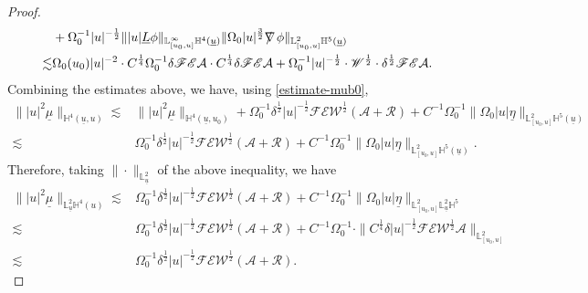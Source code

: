 \documentclass[11pt,reqno]{amsart}
\theoremstyle{definition}
\numberwithin{equation}{section}
\renewcommand{\L}{\mathbb{L}}
\renewcommand{\H}{\mathbb{H}}
\def\etab{\underline{\eta}}
\def\Lb{\underline{L}}
\def\mub{\underline{\mu}}
\def\ub{\underline{u}}
\def\nablas{\mbox{$\nabla \mkern -13mu /$ }}
\begin{document}
\begin{proof}
\begin{align*}
&+\Omega_0^{-1}|u|^{-\frac{1}{2}}\||u|\Lb\phi\|_{\L^\infty_{[u_0,u]}\H^4(\ub)}\|\Omega_0|u|^{\frac{3}{2}}\nablas\phi\|_{\L^2_{[u_0,u]}\H^5(\ub)}\\
\lesssim&\Omega_0(u_0)|u|^{-2}\cdot C^{\frac{1}{4}}\Omega_0^{-1}\delta\mathscr{F}\mathscr{E}\mathcal{A}\cdot C^{\frac{1}{4}}\delta\mathscr{F}\mathscr{E}\mathcal{A}+\Omega_0^{-1}|u|^{-\frac{1}{2}}\cdot\mathscr{W}^{\frac{1}{2}}\cdot\delta^{\frac{1}{2}}\mathscr{F}\mathscr{E}\mathcal{A}.
\end{align*}
Combining the estimates above, we have, using \eqref{estimate-mub0},
\begin{align*}
\||u|^2\mub\|_{\H^4(\ub,u)}\lesssim&\||u|^2\mub\|_{\H^4(\ub,u_0)}+\Omega_0^{-1}\delta^{\frac{1}{2}}|u|^{-\frac{1}{2}}\mathscr{F}\mathscr{E}\mathscr{W}^{\frac{1}{2}}(\mathcal{A}+\mathcal{R})+C^{-1}\Omega_0^{-1}\|\Omega_0|u|\etab\|_{\L^2_{[u_0,u]}\H^5(\ub)}\\
\lesssim&\Omega_0^{-1}\delta^{\frac{1}{2}}|u|^{-\frac{1}{2}}\mathscr{F}\mathscr{E}\mathscr{W}^{\frac{1}{2}}(\mathcal{A}+\mathcal{R})+C^{-1}\Omega_0^{-1}\|\Omega_0|u|\etab\|_{\L^2_{[u_0,u]}\H^5(\ub)}.
\end{align*}
Therefore, taking $\|\cdot\|_{\L^2_{\ub}}$ of the above inequality, we have
\begin{equation}\label{estimate-mub}
\begin{split}
\||u|^2\mub\|_{\L^2_{\ub}\H^4(u)}\lesssim&\Omega_0^{-1}\delta^{\frac{1}{2}}|u|^{-\frac{1}{2}}\mathscr{F}\mathscr{E}\mathscr{W}^{\frac{1}{2}}(\mathcal{A}+\mathcal{R})+C^{-1}\Omega_0^{-1}\|\Omega_0|u|\etab\|_{\L^2_{[u_0,u]}\L^2_{\ub}\H^5}\\
\lesssim&\Omega_0^{-1}\delta^{\frac{1}{2}}|u|^{-\frac{1}{2}}\mathscr{F}\mathscr{E}\mathscr{W}^{\frac{1}{2}}(\mathcal{A}+\mathcal{R})+C^{-1}\Omega_0^{-1}\cdot\|C^{\frac{1}{4}}\delta|u|^{-\frac{1}{2}}\mathscr{F}\mathscr{E}\mathscr{W}^{\frac{1}{2}}\mathcal{A}\|_{\L^2_{[u_0,u]}}\\
\lesssim&\Omega_0^{-1}\delta^{\frac{1}{2}}|u|^{-\frac{1}{2}}\mathscr{F}\mathscr{E}\mathscr{W}^{\frac{1}{2}}(\mathcal{A}+\mathcal{R}).
\end{split}
\end{equation}


\end{proof}
\end{document}
